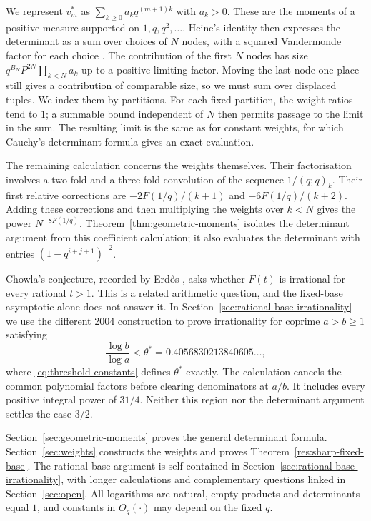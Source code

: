 \documentclass[11pt]{article}
\begin{document}
We represent $v_m^*$ as $\sum_{k\ge0}a_kq^{(m+1)k}$ with $a_k>0$.
These are the moments of a positive measure supported on
$1,q,q^2,\ldots$. Heine's identity then expresses the determinant
as a sum over choices of $N$ nodes, with a squared Vandermonde
factor for each choice \cite[\S2, (2)--(5)]{zudilin2017det}.
The contribution of the first $N$ nodes has size
$q^{B_N}P^{2N}\prod_{k<N}a_k$ up to a positive limiting factor.
Moving the last node one place still gives a contribution of comparable
size, so we must sum over displaced tuples. We index them by partitions.
For each fixed partition, the weight ratios tend to $1$; a summable
bound independent of $N$ then permits passage to the limit in the sum.
The resulting limit is the same as for constant weights, for which
Cauchy's determinant formula gives an exact evaluation.

The remaining calculation concerns the weights themselves.
Their factorisation involves a two-fold and a three-fold convolution
of the sequence $1/(q;q)_k$. Their first relative corrections are $-2F(1/q)/(k+1)$ and
$-6F(1/q)/(k+2)$. Adding these corrections and then multiplying the
weights over $k<N$ gives the power $N^{-8F(1/q)}$.
Theorem~\ref{thm:geometric-moments} isolates the determinant argument
from this coefficient calculation; it also evaluates the determinant
with entries $(1-q^{i+j+1})^{-2}$.

Chowla's conjecture, recorded by Erd\H{o}s
\cite[p.~102]{erdos1988}, asks whether $F(t)$ is irrational for every
rational $t>1$. This is a related arithmetic question, and the
fixed-base asymptotic alone does not answer it. In
Section~\ref{sec:rational-base-irrationality} we use the different
2004 construction \cite[\S5]{zudilin2004} to prove irrationality for
coprime $a>b\ge1$ satisfying
\[
 \frac{\log b}{\log a}<\theta^*
 =0.4056830213840605\ldots,
\]
where \eqref{eq:threshold-constants} defines $\theta^*$ exactly.
The calculation cancels the common polynomial factors before
clearing denominators at $a/b$. It includes every positive integral
power of $31/4$. Neither this region nor the determinant argument
settles the case $3/2$.

Section~\ref{sec:geometric-moments} proves the general determinant
formula. Section~\ref{sec:weights} constructs the weights and proves
Theorem~\ref{res:sharp-fixed-base}. The rational-base argument is
self-contained in Section~\ref{sec:rational-base-irrationality},
with longer calculations and complementary questions linked in
Section~\ref{sec:open}. All logarithms are natural, empty products
and determinants equal $1$, and constants in $O_q(\cdot)$ may depend
on the fixed $q$.
\end{document}
